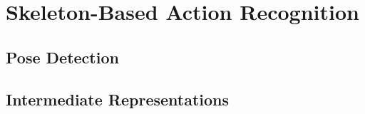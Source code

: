 \section{Skeleton-Based Action Recognition}

\subsection{Pose Detection}

\subsection{Intermediate Representations}